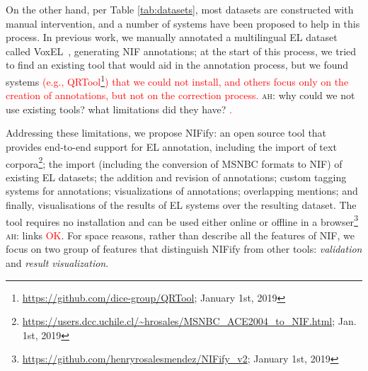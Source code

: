 \documentclass[sigconf]{acmart}
\newcommand{\ah}[1]{{\color{blue}\textsc{ah:} #1}}
\begin{document}
On the other hand, per Table \ref{tab:datasets}, most datasets are constructed with manual intervention, and a number of systems have been proposed to help in this process. In previous work, we manually annotated a multilingual EL dataset called VoxEL~\cite{VoxEL2018}, generating NIF annotations; at the start of this process, we tried to find an existing tool that would aid in the annotation process, but we found systems \textcolor{red}{(e.g., QRTool\footnote{\url{https://github.com/dice-group/QRTool}; January 1st, 2019}) that we could not install, and others focus only on the creation of annotations, but not on the correction process.} \ah{why could we not use existing tools? what limitations did they have?} \textcolor{red}{.}


Addressing these limitations, we propose NIFify: an open source tool that provides end-to-end support for EL annotation, including the import of text corpora\footnote{\url{https://users.dcc.uchile.cl/~hrosales/MSNBC_ACE2004_to_NIF.html}; Jan. 1st, 2019}; the import (including the conversion of MSNBC formats to NIF) of existing EL datasets; the addition and revision of annotations; custom tagging systems for annotations; visualizations of annotations; overlapping mentions; and finally, visualisations of the results of EL systems over the resulting dataset. The tool requires no installation and can be used either online or offline in a browser\footnote{\url{https://github.com/henryrosalesmendez/NIFify_v2}; January 1st, 2019} \ah{links} \textcolor{red}{OK}. For space reasons, rather than describe all the features of NIF, we focus on two group of features that distinguish NIFify from other tools: \textit{validation} and \textit{result visualization}.


\end{document}
